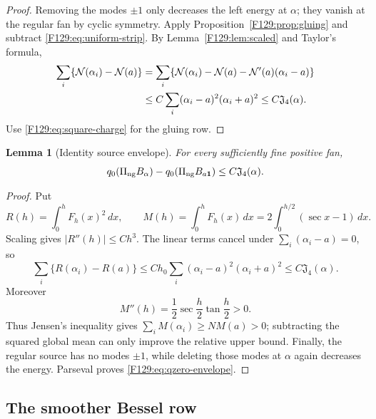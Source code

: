 \documentclass[11pt]{amsart}
\numberwithin{equation}{section}
\newtheorem{lemma}[theorem]{Lemma}
\theoremstyle{definition}
\theoremstyle{remark}
\newcommand{\PiNG}{\Pi_{\rm ng}}
\newcommand{\Jfour}{\mathfrak J_4}
\newcommand{\qzero}{q_0}
\begin{document}
\begin{proof}
Removing the modes \(\pm1\) only decreases the left energy at \(\alpha\);
they vanish at the regular fan by cyclic symmetry.  Apply
Proposition~\ref{F129:prop:gluing} and subtract \eqref{F129:eq:uniform-strip}.
By Lemma~\ref{F129:lem:scaled} and Taylor's formula,
\begin{align}
 \sum_i\{\mathcal N(\alpha_i)-\mathcal N(a)\}
 &=\sum_i\{\mathcal N(\alpha_i)-\mathcal N(a)
           -\mathcal N'(a)(\alpha_i-a)\}\notag\\
 &\le C\sum_i(\alpha_i-a)^2(\alpha_i+a)^2
 \le C\Jfour(\alpha).\label{F129:eq:N-Bregman}
\end{align}
Use \eqref{F129:eq:square-charge} for the gluing row.
\end{proof}

\begin{lemma}[Identity source envelope]\label{F129:lem:qzero}
For every sufficiently fine positive fan,
\begin{equation}\label{F129:eq:qzero-envelope}
 \qzero(\PiNG B_\alpha)-\qzero(\PiNG B_{a\mathbf1})
 \le C\Jfour(\alpha).
\end{equation}
\end{lemma}

\begin{proof}
Put
\begin{equation}
 R(h)=\int_0^hF_h(x)^2\,dx,\qquad
 M(h)=\int_0^hF_h(x)\,dx
     =2\int_0^{h/2}(\sec x-1)\,dx.
\end{equation}
Scaling gives \(|R''(h)|\le Ch^3\).  The linear terms cancel under
\(\sum_i(\alpha_i-a)=0\), so
\begin{equation}
 \sum_i\{R(\alpha_i)-R(a)\}
 \le C h_0\sum_i(\alpha_i-a)^2(\alpha_i+a)^2
 \le C\Jfour(\alpha).
\end{equation}
Moreover
\begin{equation}
 M''(h)=\frac12\sec\frac h2\tan\frac h2>0.
\end{equation}
Thus Jensen's inequality gives
\(\sum_iM(\alpha_i)\ge NM(a)>0\); subtracting the squared global mean can
only improve the relative upper bound.  Finally, the regular source has no
modes \(\pm1\), while deleting those modes at \(\alpha\) again decreases
the energy.  Parseval proves \eqref{F129:eq:qzero-envelope}.
\end{proof}

\subsection{The smoother Bessel row}
\end{document}
